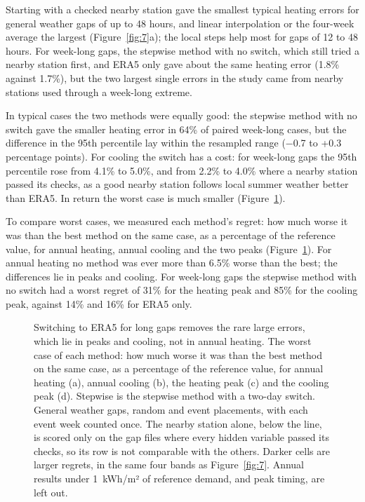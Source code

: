 Starting with a checked nearby station gave the smallest typical heating errors for general weather gaps of up to 48 hours, and linear interpolation or the four-week average the largest (Figure~\ref{fig:7}a); the local steps help most for gaps of 12 to 48 hours. For week-long gaps, the stepwise method with no switch, which still tried a nearby station first, and ERA5 only gave about the same heating error (1.8\% against 1.7\%), but the two largest single errors in the study came from nearby stations used through a week-long extreme.

In typical cases the two methods were equally good: the stepwise method with no switch gave the smaller heating error in 64\% of paired week-long cases, but the difference in the 95th percentile lay within the resampled range (−0.7 to +0.3 percentage points). For cooling the switch has a cost: for week-long gaps the 95th percentile rose from 4.1\% to 5.0\%, and from 2.2\% to 4.0\% where a nearby station passed its checks, as a good nearby station follows local summer weather better than ERA5. In return the worst case is much smaller (Figure~\ref{fig:11}).

To compare worst cases, we measured each method's regret: how much worse it was than the best method on the same case, as a percentage of the reference value, for annual heating, annual cooling and the two peaks (Figure~\ref{fig:11}). For annual heating no method was ever more than 6.5\% worse than the best; the differences lie in peaks and cooling. For week-long gaps the stepwise method with no switch had a worst regret of 31\% for the heating peak and 85\% for the cooling peak, against 14\% and 16\% for ERA5 only.

\begin{figure}[tbp]
\centering
{}
\caption{Switching to ERA5 for long gaps removes the rare large errors, which lie in peaks and cooling, not in annual heating. The worst case of each method: how much worse it was than the best method on the same case, as a percentage of the reference value, for annual heating (a), annual cooling (b), the heating peak (c) and the cooling peak (d). Stepwise is the stepwise method with a two-day switch. General weather gaps, random and event placements, with each event week counted once. The nearby station alone, below the line, is scored only on the gap files where every hidden variable passed its checks, so its row is not comparable with the others. Darker cells are larger regrets, in the same four bands as Figure~\ref{fig:7}. Annual results under 1~kWh/m² of reference demand, and peak timing, are left out.}
\label{fig:11}
\end{figure}

